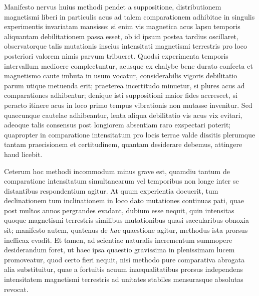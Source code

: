 Manifesto nervus huius methodi pendet a suppositione, distributionem magnetismi liberi in particulis acus ad talem comparationem adhibitae in singulis experimentis invariatam mansisse: si enim vis magnetica acus lapsu temporis aliquantam debilitationem passa esset, ob id ipsum postea tardius oscillaret, observatorque talis mutationis inscius intensitati magnetismi terrestris pro loco posteriori valorem nimis parvum tribueret. Quodsi experimenta temporis intervallum mediocre complectuntur, acusque ex chalybe bene durato confecta et magnetismo caute imbuta in usum vocatur, considerabilis vigoris debilitatio parum utique metuenda erit; praeterea incertitudo minuetur, si plures acus ad comparationes adhibentur; denique isti suppositioni maior fides accrescet, si peracto itinere acus in loco primo tempus vibrationis non mutasse invenitur. Sed quaecunque cautelae adhibeantur, lenta aliqua debilitatio vis acus vix evitari, adeoque talis consensus post longiorem absentiam raro exspectari poterit; quapropter in comparatione intensitatum pro locis terrae valde dissitis plerumque tantam praecisionem et certitudinem, quantam desiderare debemus, attingere haud licebit.

Ceterum hoc methodi incommodum minus grave est, quamdiu tantum de comparatione intensitatum simultanearum vel temporibus non longe inter se distantibus respondentium agitur. At quum experientia docuerit, tum declinationem tum inclinationem in loco dato mutationes continuas pati, quae post multos annos pergrandes evadant, dubium esse nequit, quin intensitas quoque magnetismi terrestris similibus mutationibus quasi saecularibus obnoxia sit; manifesto autem, quatenus de \textit{hac} quaestione agitur, methodus ista prorsus inefficax evadit. Et tamen, ad scientiae naturalis incrementum summopere desiderandum foret, ut haec ipsa quaestio gravissima in plenissimam lucem promoveatur, quod certo fieri nequit, nisi methodo pure comparativa abrogata alia substituitur, quae a fortuitis acuum inaequalitatibus prorsus independens intensitatem magnetismi terrestris ad unitates stabiles mensurasque absolutas revocat.

